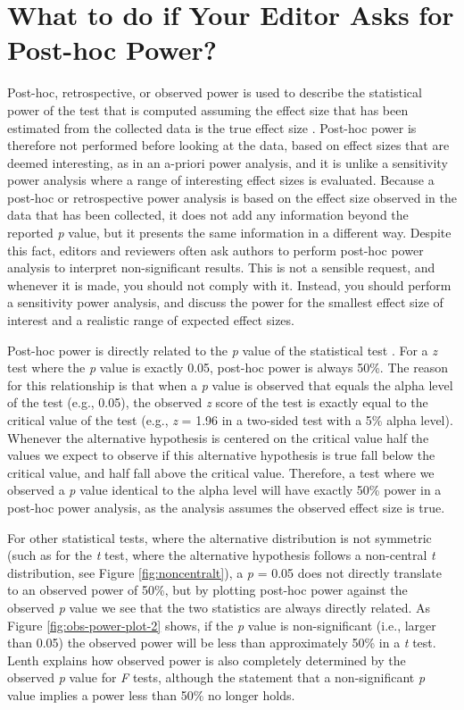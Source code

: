 \documentclass[
  oneside]{book}
\begin{document}
\hypertarget{posthocpower}{%
\section{What to do if Your Editor Asks for Post-hoc Power?}\label{posthocpower}}

Post-hoc, retrospective, or observed power is used to describe the statistical power of the test that is computed assuming the effect size that has been estimated from the collected data is the true effect size \citep{zumbo_note_1998, lenth_post_2007}. Post-hoc power is therefore not performed before looking at the data, based on effect sizes that are deemed interesting, as in an a-priori power analysis, and it is unlike a sensitivity power analysis where a range of interesting effect sizes is evaluated. Because a post-hoc or retrospective power analysis is based on the effect size observed in the data that has been collected, it does not add any information beyond the reported \emph{p} value, but it presents the same information in a different way. Despite this fact, editors and reviewers often ask authors to perform post-hoc power analysis to interpret non-significant results. This is not a sensible request, and whenever it is made, you should not comply with it. Instead, you should perform a sensitivity power analysis, and discuss the power for the smallest effect size of interest and a realistic range of expected effect sizes.

Post-hoc power is directly related to the \emph{p} value of the statistical test \citep{hoenig_abuse_2001}. For a \emph{z} test where the \emph{p} value is exactly 0.05, post-hoc power is always 50\%. The reason for this relationship is that when a \emph{p} value is observed that equals the alpha level of the test (e.g., 0.05), the observed \emph{z} score of the test is exactly equal to the critical value of the test (e.g., \emph{z} = 1.96 in a two-sided test with a 5\% alpha level). Whenever the alternative hypothesis is centered on the critical value half the values we expect to observe if this alternative hypothesis is true fall below the critical value, and half fall above the critical value. Therefore, a test where we observed a \emph{p} value identical to the alpha level will have exactly 50\% power in a post-hoc power analysis, as the analysis assumes the observed effect size is true.

For other statistical tests, where the alternative distribution is not symmetric (such as for the \emph{t} test, where the alternative hypothesis follows a non-central \emph{t} distribution, see Figure \ref{fig:noncentralt}), a \emph{p} = 0.05 does not directly translate to an observed power of 50\%, but by plotting post-hoc power against the observed \emph{p} value we see that the two statistics are always directly related. As Figure \ref{fig:obs-power-plot-2} shows, if the \emph{p} value is non-significant (i.e., larger than 0.05) the observed power will be less than approximately 50\% in a \emph{t} test. Lenth \citeyearpar{lenth_post_2007} explains how observed power is also completely determined by the observed \emph{p} value for \emph{F} tests, although the statement that a non-significant \emph{p} value implies a power less than 50\% no longer holds.
\end{document}
